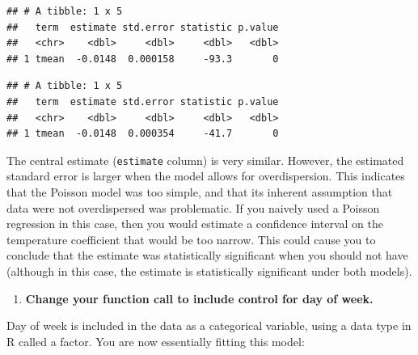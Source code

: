 \documentclass[
]{book}
\newenvironment{Shaded}{\begin{snugshade}}{\end{snugshade}}
\newcommand{\KeywordTok}[1]{\textcolor[rgb]{0.13,0.29,0.53}{\textbf{#1}}}
\newcommand{\NormalTok}[1]{#1}
\newcommand{\OperatorTok}[1]{\textcolor[rgb]{0.81,0.36,0.00}{\textbf{#1}}}
\newcommand{\StringTok}[1]{\textcolor[rgb]{0.31,0.60,0.02}{#1}}
\providecommand{\tightlist}{%
  \setlength{\itemsep}{0pt}\setlength{\parskip}{0pt}}
\begin{document}
\begin{Shaded}
\end{Shaded}

\begin{verbatim}
## # A tibble: 1 x 5
##   term  estimate std.error statistic p.value
##   <chr>    <dbl>     <dbl>     <dbl>   <dbl>
## 1 tmean  -0.0148  0.000158     -93.3       0
\end{verbatim}

\begin{Shaded}
\end{Shaded}

\begin{verbatim}
## # A tibble: 1 x 5
##   term  estimate std.error statistic p.value
##   <chr>    <dbl>     <dbl>     <dbl>   <dbl>
## 1 tmean  -0.0148  0.000354     -41.7       0
\end{verbatim}

The central estimate (\texttt{estimate} column) is very similar. However, the estimated
standard error is larger when the model allows for overdispersion. This
indicates that the Poisson model was too simple, and that its inherent
assumption that data were not overdispersed was problematic. If you naively used
a Poisson regression in this case, then you would estimate a confidence
interval on the temperature coefficient that would be too narrow. This could
cause you to conclude that the estimate was statistically significant when
you should not have (although in this case, the estimate is statistically
significant under both models).

\begin{enumerate}
\def\labelenumi{\arabic{enumi}.}
\setcounter{enumi}{3}
\tightlist
\item
  \textbf{Change your function call to include control for day of week.}
\end{enumerate}

Day of week is included in the data as a categorical variable, using a
data type in R called a factor. You are now essentially fitting this model:
\end{document}
